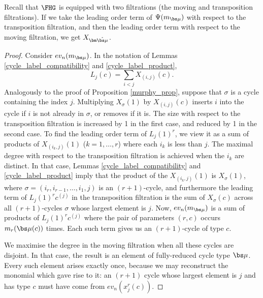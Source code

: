 \begin{proposition}
Recall that $\FHG$ is equipped with two filtrations \textup{(}the moving and transposition filtrations\textup{)}. If we take the leading order term of $\Psi(m_{\bs\mu})$ with respect to the transposition filtration, and then the leading order term with respect to the  moving filtration, we get $X_{\bm\hat{\bs\mu}}$.
\end{proposition}

\begin{proof}
Consider $ev_n(m_{\bs\mu})$. In the notation of Lemmas \ref{cycle_label_compatibility} and \ref{cycle_label_product},
\[
L_j(c) = \sum_{i<j} X_{(i,j)}(c).
\]
Analogously to the proof of Proposition \ref{murphy_prop}, suppose that $\sigma$ is a cycle containing the index $j$. Multiplying $X_{\sigma}(1)$ by $X_{(i,j)}(c)$ inserts $i$ into the cycle if $i$ is not already in $\sigma$, or removes if it is. The size with respect to the transposition filtration is increased by 1 in the first case, and reduced by 1 in the second case. To find the leading order term of $L_j(1)^r$, we view it as a sum of products of $X_{(i_k,j)}(1)$ ($k=1,\ldots,r$) where each $i_k$ is less than $j$. The maximal degree with respect to the transposition filtration is achieved when the $i_k$ are distinct. In that case, Lemmas \ref{cycle_label_compatibility} and \ref{cycle_label_product} imply that the product of the $X_{(i_k,j)}(1)$ is $X_{\sigma}(1)$, where $\sigma = (i_r, i_{r-1}, \ldots, i_1, j)$ is an $(r+1)$-cycle, and furthermore the leading term of $L_j(1)^r c^{(j)}$ in the transposition filtration is the sum of $X_{\sigma}(c)$ across all $(r+1)$-cycles $\sigma$ whose largest element is $j$. Now, $ev_n(m_{\bs\mu})$ is a sum of products of $L_j(1)^r c^{(j)}$ where the pair of parameters $(r, c)$ occurs $m_r(\bs\mu(c))$ times. Each such term gives us an $(r+1)$-cycle of type $c$.

We maximise the degree in the moving filtration when all these cycles are disjoint. In that case, the result is an element of fully-reduced cycle type $\bs\mu$. Every such element arises exactly once, because we may reconstruct the monomial which gave rise to it: an $(r+1)$ cycle whose largest element is $j$ and has type $c$ must have come from $ev_n(x_j^r(c))$.
\end{proof}
